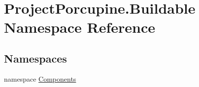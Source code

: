 \hypertarget{namespace_project_porcupine_1_1_buildable}{}\section{Project\+Porcupine.\+Buildable Namespace Reference}
\label{namespace_project_porcupine_1_1_buildable}
\subsection*{Namespaces}
\begin{DoxyCompactItemize}
\item 
namespace \hyperlink{namespace_project_porcupine_1_1_buildable_1_1_components}{Components}
\end{DoxyCompactItemize}
